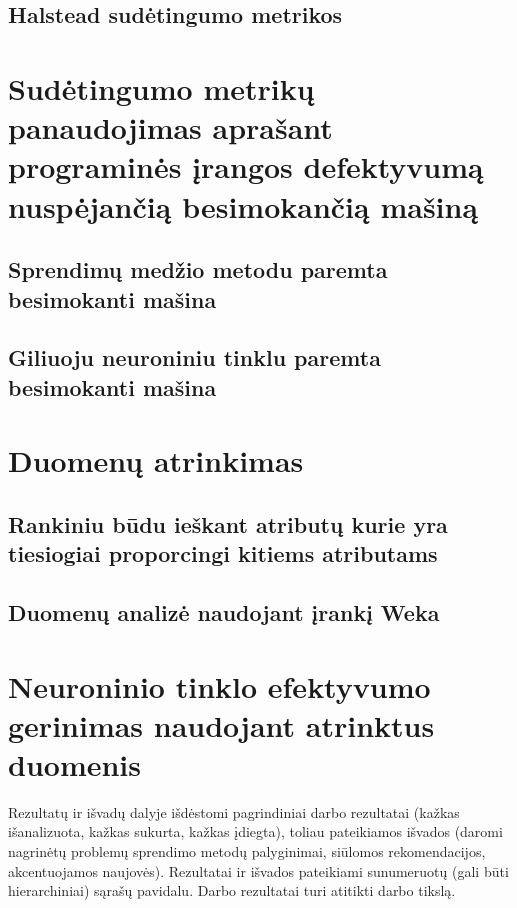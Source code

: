 \documentclass{VUMIFPSbakalaurinis}
\begin{document}
\subsection{Halstead sudėtingumo metrikos}

\section{Sudėtingumo metrikų panaudojimas aprašant programinės įrangos defektyvumą nuspėjančią besimokančią mašiną}

\subsection{Sprendimų medžio metodu paremta besimokanti mašina}

\subsection{Giliuoju neuroniniu tinklu paremta besimokanti mašina}

\section{Duomenų atrinkimas}

\subsection{Rankiniu būdu ieškant atributų kurie yra tiesiogiai proporcingi kitiems atributams}

\subsection{Duomenų analizė naudojant įrankį Weka}

\section{Neuroninio tinklo efektyvumo gerinimas naudojant atrinktus duomenis}

Rezultatų ir išvadų dalyje išdėstomi pagrindiniai darbo rezultatai (kažkas
išanalizuota, kažkas sukurta, kažkas įdiegta), toliau pateikiamos išvados
(daromi nagrinėtų problemų sprendimo metodų palyginimai, siūlomos
rekomendacijos, akcentuojamos naujovės). Rezultatai ir išvados pateikiami
sunumeruotų (gali būti hierarchiniai) sąrašų pavidalu. Darbo rezultatai turi
atitikti darbo tikslą.
\end{document}
